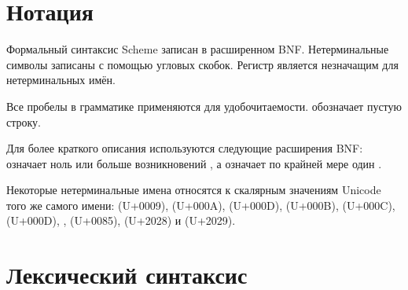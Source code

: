 \section{Нотация}
\label{BNF}

Формальный синтаксис Scheme записан в расширенном BNF. Нетерминальные символы записаны с помощью
угловых скобок. Регистр является незначащим для нетерминальных имён.

Все пробелы в грамматике применяются для удобочитаемости.  обозначает пустую строку.

Для более краткого описания используются следующие расширения BNF:  означает
ноль или больше возникновений , а  означает по крайней мере
один .

Некоторые нетерминальные имена относятся к скалярным значениям Unicode того же самого имени:
 (U+0009),  (U+000A),  (U+000D),
 (U+000B),  (U+000C),  (U+000D),
,  (U+0085),  (U+2028) и
 (U+2029).

\section{Лексический синтаксис}
\label{lexicalsyntaxsection}

